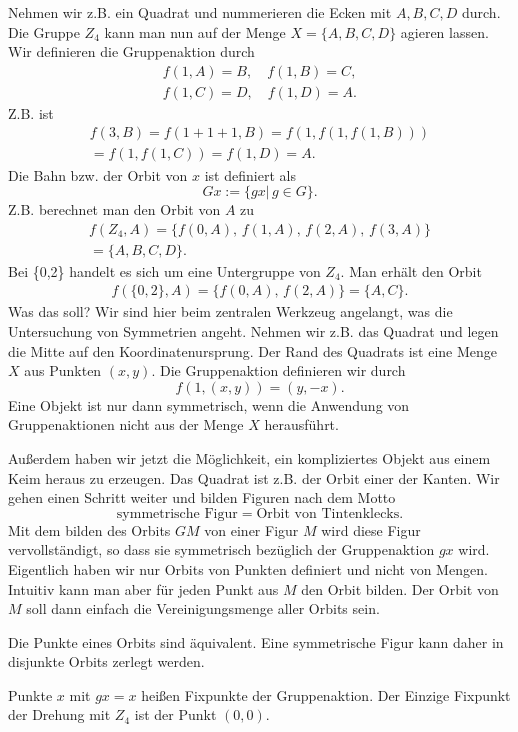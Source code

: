 \documentclass[a4paper,10pt,fleqn,twocolumn,twoside]{article}
\begin{document}
Nehmen wir z.B. ein Quadrat und nummerieren die Ecken mit \(A,B,C,D\) durch. Die Gruppe \(Z_4\) kann man nun auf der Menge \(X=\{A,B,C,D\}\) agieren lassen. Wir definieren die Gruppenaktion durch
\begin{gather*}
f(1,A)=B,\quad f(1,B)=C,\\
f(1,C)=D,\quad f(1,D)=A.
\end{gather*}
%
Z.B. ist
\begin{gather*}
f(3,B) = f(1+1+1,B) = f(1,f(1,f(1,B)))\\
= f(1,f(1,C)) = f(1,D) = A.
\end{gather*}
%
Die Bahn bzw. der Orbit von \(x\) ist definiert als
\[Gx := \{gx|\,g\in G\}.\]
Z.B. berechnet man den Orbit von \(A\) zu
\begin{gather*}
f(Z_4,A) = \{f(0,A),\,f(1,A),\,f(2,A),\,f(3,A)\}\\
= \{A,B,C,D\}.
\end{gather*}
Bei \{0,2\} handelt es sich um eine Untergruppe von \(Z_4\). Man erhält den Orbit
\begin{gather*}
f(\{0,2\},A) = \{f(0,A),\,f(2,A)\} = \{A,C\}.
\end{gather*}
%
Was das soll? Wir sind hier beim zentralen Werkzeug angelangt, was die Untersuchung von Symmetrien angeht. Nehmen wir z.B. das Quadrat und legen die Mitte auf den Koordinatenursprung. Der Rand des Quadrats ist eine Menge \(X\) aus Punkten \((x,y)\). Die Gruppenaktion definieren wir durch
\[f(1,(x,y)) = (y,-x).\]
Eine Objekt ist nur dann symmetrisch, wenn die Anwendung von Gruppenaktionen nicht aus der Menge \(X\) herausführt.

Außerdem haben wir jetzt die Möglichkeit, ein kompliziertes Objekt aus einem Keim heraus zu erzeugen. Das Quadrat ist z.B. der Orbit einer der Kanten. Wir gehen einen Schritt weiter und bilden Figuren nach dem Motto
\[\text{symmetrische Figur} = \text{Orbit von Tintenklecks}.\]
Mit dem bilden des Orbits \(GM\) von einer Figur \(M\) wird diese Figur vervollständigt, so dass sie symmetrisch bezüglich der Gruppenaktion \(gx\) wird. Eigentlich haben wir nur Orbits von Punkten definiert und nicht von Mengen. Intuitiv kann man aber für jeden Punkt aus \(M\) den Orbit bilden. Der Orbit von \(M\) soll dann einfach die Vereinigungsmenge aller Orbits sein.

Die Punkte eines Orbits sind äquivalent. Eine symmetrische Figur kann daher in disjunkte Orbits zerlegt werden.

Punkte \(x\) mit \(gx=x\) heißen Fixpunkte der Gruppenaktion. Der Einzige Fixpunkt der Drehung mit \(Z_4\) ist der Punkt \((0,0)\).
\end{document}

